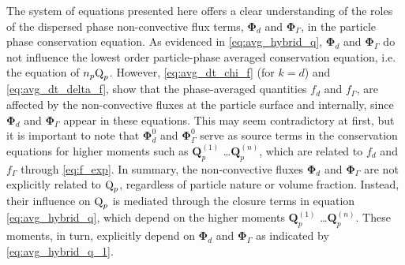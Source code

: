 The system of equations presented here offers a clear understanding of the roles of the dispersed phase non-convective flux terms, $\bm\Phi_d$ and $\bm\Phi_\Gamma$, in the particle phase conservation equation. 
As evidenced in \ref{eq:avg_hybrid_q}, $\bm{\Phi}_d$ and $\bm{\Phi}_\Gamma$  do not influence the lowest order particle-phase averaged conservation equation, i.e. the equation of $n_p \text Q_p$. 
However, \ref{eq:avg_dt_chi_f} (for $k = d$) and \ref{eq:avg_dt_delta_f}, show that the phase-averaged quantities $f_d$ and $f_\Gamma$, are affected by the non-convective fluxes at the particle surface and internally, since $\bm{\Phi}_d$ and $\bm{\Phi}_\Gamma$ appear in these equations.
This may seem contradictory at first, but it is important to note that $\bm{\Phi}_d^0$ and $\bm{\Phi}_\Gamma^0$ serve as source terms in the conservation equations for higher moments such as $\textbf{Q}^{(1)}_p$ \ldots $\textbf{Q}^{(n)}_p$, which are related to $f_d$ and $f_\Gamma$ through \ref{eq:f_exp}.
In summary, the non-convective fluxes $\bm{\Phi}_d$ and $\bm{\Phi}_\Gamma$  are not explicitly related to $\text Q_p$, regardless of particle nature or volume fraction. 
Instead, their influence on $\text Q_p$ is mediated through the closure terms in equation \ref{eq:avg_hybrid_q}, which depend on the higher moments $\textbf{Q}^{(1)}_p$ \ldots $\textbf{Q}^{(n)}_p$. These moments, in turn, explicitly depend on $\bm{\Phi}_d$ and $\bm{\Phi}_\Gamma$ as indicated by \ref{eq:avg_hybrid_q_1}. 





